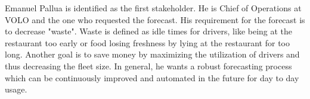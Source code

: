 \begin{table}[h]
\centering
\caption{SIPOC Diagram derived from the five basic steps}
\label{tab:sipoc}
\end{table}
Emanuel Pallua is identified as the first stakeholder. He is Chief of Operations at VOLO and the one who requested the forecast. His requirement for the forecast is to decrease "waste". Waste is defined as idle times for drivers, like being at the restaurant too early or food losing freshness by lying at the restaurant for too long. Another goal is to save money by maximizing the utilization of drivers and thus decreasing the fleet size. In general, he wants a robust forecasting process which can be continuously improved and automated in the future for day to day usage. \newline
